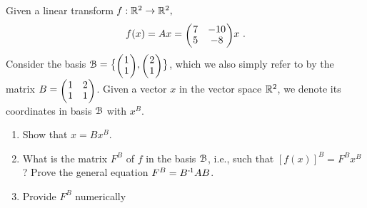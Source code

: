 

\renewcommand{\course}{Maths for Intelligent Systems}
\renewcommand{\coursedate}{Summer 2019}

\renewcommand{\exnum}{Exercise 1}

\exercises


\exercisestitle











Given a linear transform $f: {\mathbb{R}}^2 \to {\mathbb{R}}^2,$
$$ f(x) = A x = \mat{cc}{7 & -10 \\ 5 & -8} x ~.$$ Consider the basis
$\BB = \big\{ \mat{c}{1\\1}, \mat{c}{2\\1} \big\}$, which we also
simply refer to by the matrix $B=\mat{cc}{1 & 2 \\ 1 & 1}$. Given a
vector $x$ in the vector space ${\mathbb{R}}^2$, we denote its coordinates in
basis ${\cal B}$ with $x^B$.

\begin{enumerate}
\item Show that $x = B x^B$.


\item What is the matrix $F^B$ of $f$ in the basis ${\cal B}$, i.e., such that $[f(x)]^B = F^B x^B$? Prove the general equation $F^B = B^{{\hspace*{-.0pt}\text{\rm -}\hspace*{-.5pt}}1} A B$.


\item Provide $F^B$ numerically
\end{enumerate}

